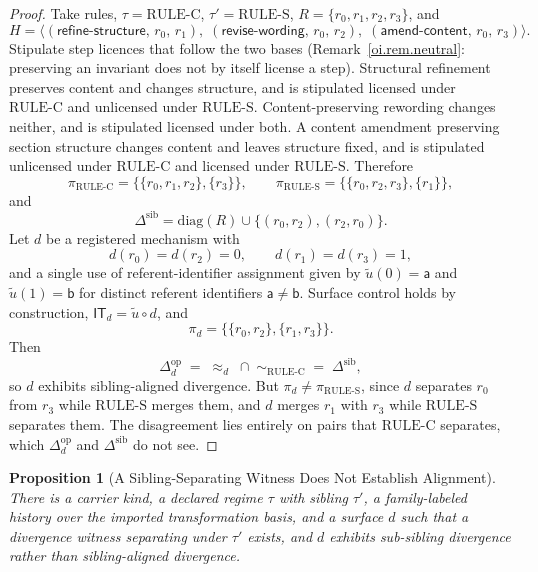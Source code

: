 \documentclass[11pt]{article}
\theoremstyle{plain}
\newtheorem{proposition}[theorem]{Proposition}
\theoremstyle{definition}
\theoremstyle{remark}
\newcommand{\RULEC}{\ensuremath{\mathrm{RULE\text{-}C}}}
\newcommand{\RULES}{\ensuremath{\mathrm{RULE\text{-}S}}}
\newcommand{\IT}{\ensuremath{\mathsf{IT}}}
\newcommand{\Ker}{\ensuremath{\mathrel{\approx_{d}}}}
\newcommand{\Dop}{\ensuremath{\Delta^{\mathrm{op}}_{d}}}
\newcommand{\Dsib}{\ensuremath{\Delta^{\mathrm{sib}}}}
\begin{document}
\begin{proof}
  Take rules, \(\tau=\RULEC\), \(\tau'=\RULES\),
  \(R=\{r_0,r_1,r_2,r_3\}\), and
  \[
    H
    =
    \bigl\langle
    (\textsf{refine-structure},\,r_0,\,r_1),\;
    (\textsf{revise-wording},\,r_0,\,r_2),\;
    (\textsf{amend-content},\,r_0,\,r_3)
    \bigr\rangle.
  \]
  Stipulate step licences that follow the two bases
  (Remark~\ref{oi.rem.neutral}: preserving an invariant does not by itself license a step).
  Structural refinement preserves content and changes structure,
  and is stipulated licensed under \RULEC{} and unlicensed under \RULES{}.
  Content-preserving rewording changes neither,
  and is stipulated licensed under both.
  A content amendment preserving section structure
  changes content and leaves structure fixed,
  and is stipulated unlicensed under \RULEC{} and licensed under \RULES{}.
  Therefore
  \[
    \pi_{\RULEC}
    =
    \bigl\{\{r_0,r_1,r_2\},\{r_3\}\bigr\},
    \qquad
    \pi_{\RULES}
    =
    \bigl\{\{r_0,r_2,r_3\},\{r_1\}\bigr\},
  \]
  and
  \[
    \Dsib
    =
    \mathrm{diag}(R)\cup\bigl\{(r_0,r_2),(r_2,r_0)\bigr\}.
  \]
  Let \(d\) be a registered mechanism with
  \[
    d(r_0)=d(r_2)=0,
    \qquad
    d(r_1)=d(r_3)=1,
  \]
  and a single use of referent-identifier assignment
  given by \(\tilde{u}(0)=\mathsf{a}\) and \(\tilde{u}(1)=\mathsf{b}\)
  for distinct referent identifiers \(\mathsf{a}\neq\mathsf{b}\).
  Surface control holds by construction,
  \(\IT_d=\tilde{u}\circ d\),
  and
  \[
    \pi_d
    =
    \bigl\{\{r_0,r_2\},\{r_1,r_3\}\bigr\}.
  \]
  Then
  \[
    \Dop
    \;=\;
    \Ker\;\cap\;\sim_{\RULEC}
    \;=\;
    \Dsib,
  \]
  so \(d\) exhibits sibling-aligned divergence.
  But \(\pi_d\neq\pi_{\RULES}\),
  since \(d\) separates \(r_0\) from \(r_3\)
  while \RULES{} merges them,
  and \(d\) merges \(r_1\) with \(r_3\)
  while \RULES{} separates them.
  The disagreement lies entirely on pairs that \RULEC{} separates,
  which \(\Dop\) and \(\Dsib\) do not see.
\end{proof}

\begin{proposition}[A Sibling-Separating Witness Does Not Establish Alignment]
  \label{oi.prop.witness-not-alignment}
  There is a carrier kind, a declared regime \(\tau\) with sibling \(\tau'\),
  a family-labeled history over the imported transformation basis,
  and a surface \(d\)
  such that a divergence witness separating under \(\tau'\) exists,
  and \(d\) exhibits sub-sibling divergence rather than sibling-aligned divergence.
\end{proposition}
\end{document}
